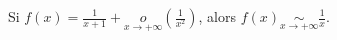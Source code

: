 Si $f(x)=\frac1{x+1}+\underset{x\to+\infty}o\left(\frac1{x^2}\right)$, alors $f(x)\underset{x\to+\infty}{\sim}\frac1{x}$.

\begin{reponses}
\end{reponses}

